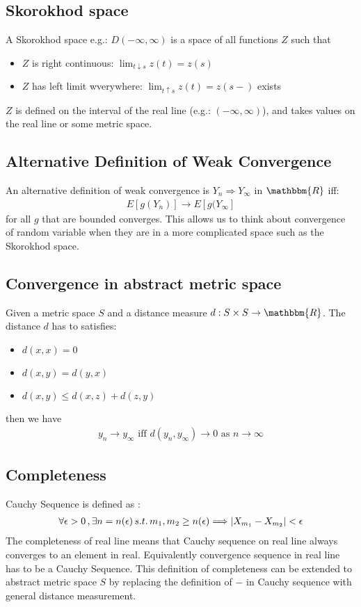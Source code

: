 \subsection{Skorokhod space}
A Skorokhod space e.g.: $D(-\infty, \infty)$ is a space of all functions $Z$ such that 
    \begin{itemize}
        \item $Z$ is right continuous: $\lim_{t \downarrow s}z(t) = z(s)$
        \item $Z$ has left limit wverywhere: $\lim_{t \uparrow s}z(t) = z(s-)$ exists
    \end{itemize}
$Z$ is defined on the interval of the real line (e.g.: $(-\infty, \infty)$), and takes values on the real line or some metric space. 

\subsection{Alternative Definition of Weak Convergence} 
An alternative definition of weak convergence is $Y_n \Rightarrow Y_\infty$ in $\mathbbm{R}$ iff: 
    \begin{align*}
    E[g(Y_n)] \to E[g(Y_\infty]
    \end{align*}
for all $g$ that are bounded converges. This allows us to think about convergence of random variable when they are in a more complicated space such as the Skorokhod space. 

\subsection{Convergence in abstract metric space}
Given a metric space $S$ and a distance measure $d: S \times S \to \mathbbm{R}$. The distance $d$ has to satisfies: 
    \begin{itemize}
        \item $d(x,x) = 0$
        \item $d(x,y) = d(y,x)$
        \item $d(x,y) \leq d(x,z) + d(z,y)$
    \end{itemize}
then we have 
    \begin{align*}
        y_n \to y_\infty \text{ iff } d(y_n, y_\infty) \to 0 \text{ as } n \to \infty
    \end{align*}
    
\subsection{Completeness}
Cauchy Sequence is defined as :
    \begin{align*}
        \forall \epsilon > 0 \,, \exists n = n(\epsilon) \, s.t. \, m_1, m_2 \geq n(\epsilon) \Longrightarrow \left| X_{m_1} -X_{m_2} \right| < \epsilon
    \end{align*}
The completeness of real line means that Cauchy sequence on real line always converges to an element in real. Equivalently convergence sequence in real line has to be a Cauchy Sequence. This definition of completeness can be extended to abstract metric space $S$ by replacing the definition of $-$ in Cauchy sequence with general distance measurement. 

